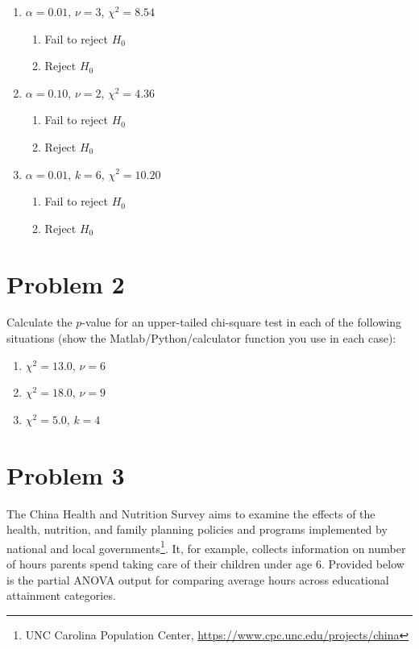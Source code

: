 \documentclass[11pt,twoside]{article}
\newcommand{\pts}[1]{\marginpar{ \small\hspace{0pt} \textit{[#1]} } }
\numberwithin{equation}{section}
\newcommand{\?}{\stackrel{?}{=}}
\begin{document}
\begin{enumerate}[\bf (a)]
	\item $\alpha = 0.01$, $\nu = 3$, $\chi^2 = 8.54$ \pts{3}
	\vspace{20ex}
	\begin{enumerate}[\bf i.]
		\item Fail to reject $H_0$
		\item Reject $H_0$
	\end{enumerate}
	\item $\alpha = 0.10$, $\nu = 2$, $\chi^2 = 4.36$ \pts{3}
		\vspace{20ex}
	\begin{enumerate}[\bf i.]
		\item Fail to reject $H_0$
		\item Reject $H_0$
	\end{enumerate}
	\item $\alpha = 0.01$, $k = 6$, $\chi^2 = 10.20$ \pts{3}
		\vspace{20ex}
	\begin{enumerate}[\bf i.]
		\item Fail to reject $H_0$
		\item Reject $H_0$
	\end{enumerate}
\end{enumerate}


\section*{Problem 2      }
Calculate the $p$-value for an upper-tailed chi-square test in each of the following situations (show the Matlab/Python/calculator function you use in each case):
\begin{enumerate}[\bf (a)]
	\item $\chi^2 = 13.0$, $\nu = 6$\pts{2}
	\vspace{30ex}
	\item  $\chi^2 = 18.0$, $\nu = 9$\pts{2}
	\vspace{30ex}
	\item $\chi^2 = 5.0$, $k =4$\pts{2}
	\vspace{30ex}
\end{enumerate}

\eject
\section*{Problem 3       }
The China Health and Nutrition Survey aims to examine the effects of the health,
nutrition, and family planning policies and programs implemented by national and
local governments\footnote{UNC Carolina Population Center,
	\url{https://www.cpc.unc.edu/projects/china}}. It, for example, collects
information on number of hours  parents spend taking care of their
children under age 6.  Provided below is
the partial ANOVA output for comparing average hours across educational attainment
categories.
\end{document}
